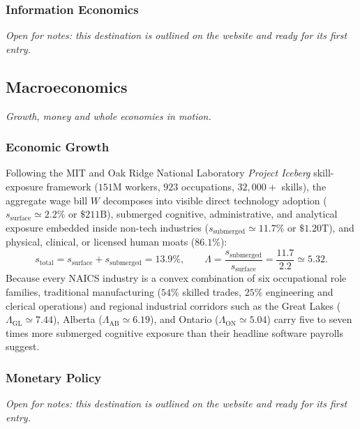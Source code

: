 \documentclass{article}
\newcounter{subsubsubsection}[subsubsection]
\begin{document}
\subsubsection{Information Economics}\label{sec:information-economics}
\textit{Open for notes: this destination is outlined on the website and ready for its first entry.}

\subsection{Macroeconomics}\label{sec:macroeconomics}
\textit{Growth, money and whole economies in motion.}

\subsubsection{Economic Growth}\label{sec:economic-growth}

Following the MIT and Oak Ridge National Laboratory \textit{Project Iceberg} skill-exposure framework ($151\text{M}$ workers, $923$ occupations, $32{,}000+$ skills), the aggregate wage bill $W$ decomposes into visible direct technology adoption ($s_{\text{surface}} \simeq 2.2\%$ or $\$211\text{B}$), submerged cognitive, administrative, and analytical exposure embedded inside non-tech industries ($s_{\text{submerged}} \simeq 11.7\%$ or $\$1.20\text{T}$), and physical, clinical, or licensed human moats ($86.1\%$):
\begin{equation}
s_{\text{total}} = s_{\text{surface}} + s_{\text{submerged}} = 13.9\%, \qquad
\Lambda = \frac{s_{\text{submerged}}}{s_{\text{surface}}} = \frac{11.7}{2.2} \simeq 5.32.
\label{eq:mm-iceberg-multiplier}
\end{equation}
Because every NAICS industry is a convex combination of six occupational role families, traditional manufacturing ($54\%$ skilled trades, $25\%$ engineering and clerical operations) and regional industrial corridors such as the Great Lakes ($\Lambda_{\text{GL}} \simeq 7.44$), Alberta ($\Lambda_{\text{AB}} \simeq 6.19$), and Ontario ($\Lambda_{\text{ON}} \simeq 5.04$) carry five to seven times more submerged cognitive exposure than their headline software payrolls suggest.

\subsubsection{Monetary Policy}\label{sec:monetary-policy}
\textit{Open for notes: this destination is outlined on the website and ready for its first entry.}
\end{document}
